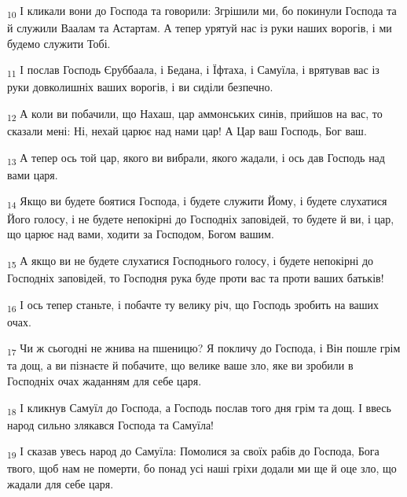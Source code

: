 \begin{tcolorbox}
\textsubscript{10} І кликали вони до Господа та говорили: Згрішили ми, бо покинули Господа та й служили Ваалам та Астартам. А тепер урятуй нас із руки наших ворогів, і ми будемо служити Тобі.
\end{tcolorbox}
\begin{tcolorbox}
\textsubscript{11} І послав Господь Єруббаала, і Бедана, і Їфтаха, і Самуїла, і врятував вас із руки довколишніх ваших ворогів, і ви сиділи безпечно.
\end{tcolorbox}
\begin{tcolorbox}
\textsubscript{12} А коли ви побачили, що Нахаш, цар аммонських синів, прийшов на вас, то сказали мені: Ні, нехай царює над нами цар! А Цар ваш Господь, Бог ваш.
\end{tcolorbox}
\begin{tcolorbox}
\textsubscript{13} А тепер ось той цар, якого ви вибрали, якого жадали, і ось дав Господь над вами царя.
\end{tcolorbox}
\begin{tcolorbox}
\textsubscript{14} Якщо ви будете боятися Господа, і будете служити Йому, і будете слухатися Його голосу, і не будете непокірні до Господніх заповідей, то будете й ви, і цар, що царює над вами, ходити за Господом, Богом вашим.
\end{tcolorbox}
\begin{tcolorbox}
\textsubscript{15} А якщо ви не будете слухатися Господнього голосу, і будете непокірні до Господніх заповідей, то Господня рука буде проти вас та проти ваших батьків!
\end{tcolorbox}
\begin{tcolorbox}
\textsubscript{16} І ось тепер станьте, і побачте ту велику річ, що Господь зробить на ваших очах.
\end{tcolorbox}
\begin{tcolorbox}
\textsubscript{17} Чи ж сьогодні не жнива на пшеницю? Я покличу до Господа, і Він пошле грім та дощ, а ви пізнаєте й побачите, що велике ваше зло, яке ви зробили в Господніх очах жаданням для себе царя.
\end{tcolorbox}
\begin{tcolorbox}
\textsubscript{18} І кликнув Самуїл до Господа, а Господь послав того дня грім та дощ. І ввесь народ сильно злякався Господа та Самуїла!
\end{tcolorbox}
\begin{tcolorbox}
\textsubscript{19} І сказав увесь народ до Самуїла: Помолися за своїх рабів до Господа, Бога твого, щоб нам не померти, бо понад усі наші гріхи додали ми ще й оце зло, що жадали для себе царя.
\end{tcolorbox}
